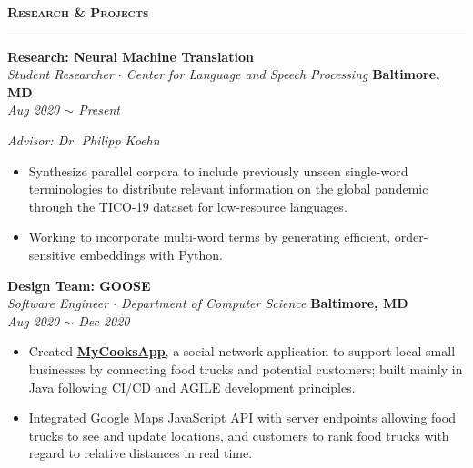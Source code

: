\documentclass[10pt, letterpaper]{article}
\begin{document}
{\large \textbf{\textsc{Research \& Projects}}}
\vspace{5pt}
\hrule
{}
\begin{paracol}{2}
	\textbf{Research: Neural Machine Translation}\\
	\textit{Student Researcher $\cdot$ Center for Language and Speech Processing}
	\switchcolumn
	\raggedleft\textbf{Baltimore, MD}\\
	\raggedleft\textit{Aug 2020 $\sim$ Present}
\end{paracol}\vspace{-2mm}
\textit{Advisor: Dr. Philipp Koehn}
\vspace{-5mm}
\begin{itemize}
	 \item Synthesize parallel corpora to include previously unseen single-word terminologies to distribute relevant information on the global pandemic through the TICO-19 dataset for low-resource languages.\vspace{-3mm}
	 \item Working to incorporate multi-word terms by generating efficient, order-sensitive embeddings with Python.
\end{itemize}
\vspace{-3mm} 

\begin{paracol}{2}
	\textbf{Design Team: GOOSE}\\
	\textit{Software Engineer $\cdot$ Department of Computer Science }
	\switchcolumn
	\raggedleft\textbf{Baltimore, MD}\\
	\raggedleft\textit{Aug 2020 $\sim$ Dec 2020}
\end{paracol}\vspace{-5mm}
\begin{itemize}
	\item Created \href{https://goosegang-foodtruck.herokuapp.com/}{\textbf{\underline{MyCooksApp}}}, a social network application to support local small businesses by connecting food trucks and potential customers; built mainly in Java following CI/CD and AGILE development principles.\vspace{-3mm}
	\item Integrated Google Maps JavaScript API with server endpoints allowing food trucks to see and update locations, and customers to rank food trucks with regard to relative distances in real time.
\end{itemize}
\vspace{-3mm} 
\end{document}

